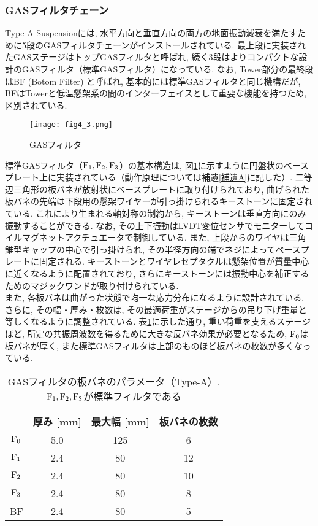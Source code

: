 \subsubsection{GASフィルタチェーン}
\label{sec4.1.1.2}
\vskip3mm
Type-A Suspensionには, 水平方向と垂直方向の両方の地面振動減衰を満たすために5段のGASフィルタチェーンがインストールされている. 最上段に実装されたGASステージはトップGASフィルタと呼ばれ, 続く3段はよりコンパクトな設計のGASフィルタ（標準GASフィルタ）になっている. なお, Tower部分の最終段はBF (Botom Filter) と呼ばれ, 基本的には標準GASフィルタと同じ機構だが, BFはTowerと低温懸架系の間のインターフェイスとして重要な機能を持つため, 区別されている. 
\begin{figure}[H]
\begin{center}
\texttt{[image: fig4\_3.png]}
\caption[GASフィルタ]{GASフィルタ}
\label{fig4.3}
\end{center}
\end{figure}
標準GASフィルタ（$\rm{F_1},\rm{F_2},\rm{F_3}$）の基本構造は, 図\ref{fig4.3}に示すように円盤状のベースプレート上に実装されている（動作原理については補遺\ref{補遺A}に記した）. 二等辺三角形の板バネが放射状にベースプレートに取り付けられており, 曲げられた板バネの先端は下段用の懸架ワイヤーが引っ掛けられるキーストーンに固定されている. これにより生まれる軸対称の制約から, キーストーンは垂直方向にのみ振動することができる. なお, その上下振動はLVDT変位センサでモニターしてコイルマグネットアクチュエータで制御している. また, 上段からのワイヤは三角錐型キャップの中心で引っ掛けられ, その半径方向の端でネジによってベースプレートに固定される. キーストーンとワイヤレセプタクルは懸架位置が質量中心に近くなるように配置されており, さらにキーストーンには振動中心を補正するためのマジックワンドが取り付けられている. \\
\quad また, 各板バネは曲がった状態で均一な応力分布になるように設計されている. さらに, その幅・厚み・枚数は, その最適荷重がステージからの吊り下げ重量と等しくなるように調整されている. 表\ref{table4.1}に示した通り, 重い荷重を支えるステージほど, 所定の共振周波数を得るために大きな反バネ効果が必要となるため, $\rm{F_0}$は板バネが厚く, また標準GASフィルタは上部のものほど板バネの枚数が多くなっている. 
\begin{table}[H]
 \centering
  \begin{tabular}{cccc}
   \hline\hline
    & 厚み [mm] & 最大幅 [mm] & 板バネの枚数 \\
   \hline 
   $\rm{F_0}$ & 5.0 & 125 & 6 \\
   $\rm{F_1}$ & 2.4 & 80  & 12 \\
   $\rm{F_2}$ & 2.4 & 80  & 10 \\
   $\rm{F_3}$ & 2.4 & 80  & 8 \\
   BF         & 2.4 & 80  & 5 \\
   \hline
  \end{tabular}
 \caption[GASフィルタの板バネのパラメータ（Type-A）]{GASフィルタの板バネのパラメータ（Type-A）. $\rm{F_1,F_2,F_3}$が標準フィルタである}
 \label{table4.1}
\end{table}
